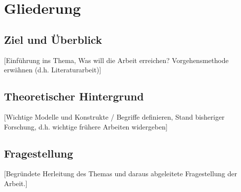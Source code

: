 \section{Gliederung}

\subsection{Ziel und Überblick}

[Einführung ins Thema, Was will die Arbeit erreichen? Vorgehensmethode erwähnen (d.h. Literaturarbeit)]


\subsection{Theoretischer Hintergrund}

[Wichtige Modelle und Konstrukte / Begriffe definieren, Stand bisheriger Forschung, d.h. wichtige frühere Arbeiten widergeben]   


\subsection{Fragestellung}

[Begründete Herleitung des Themas und daraus abgeleitete Fragestellung der Arbeit.]